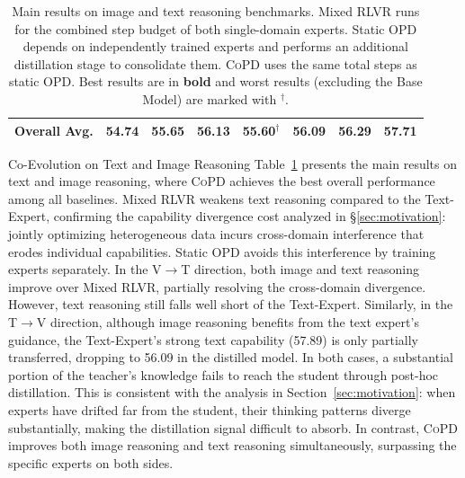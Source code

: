 \documentclass{llmxive}
\providecommand{\method}{\textsc{CoPD}\xspace}
\begin{document}
\begin{table}[t]
\begin{tabular}{l ccc c cc c}
\midrule
\rowcolor{blue!5} \textbf{Overall Avg.} & 54.74  & 55.65  & 56.13  & 55.60$^\dagger$  & 56.09  & 56.29  & \textbf{57.71} \\
\bottomrule
\end{tabular}
\caption{Main results on image and text reasoning benchmarks. Mixed RLVR runs for the combined step budget of both single-domain experts. Static OPD depends on independently trained experts and performs an additional distillation stage to consolidate them. \method uses the same total steps as static OPD. Best results are in \textbf{bold} and worst results (excluding the Base Model) are marked with $^\dagger$.}
\label{tab:two_branch_results}
\end{table}
{Co-Evolution on Text and Image Reasoning}
Table~\ref{tab:two_branch_results} presents the main results on text and image reasoning, where \method achieves the best overall performance among all baselines. Mixed RLVR weakens text reasoning compared to the Text-Expert, confirming the capability divergence cost analyzed in \S\ref{sec:motivation}: jointly optimizing heterogeneous data incurs cross-domain interference that erodes individual capabilities. Static OPD avoids this interference by training experts separately. In the V$\to$T direction, both image and text reasoning improve over Mixed RLVR, partially resolving the cross-domain divergence. However, text reasoning still falls well short of the Text-Expert. Similarly, in the T$\to$V direction, although image reasoning benefits from the text expert's guidance, the Text-Expert's strong text capability (57.89) is only partially transferred, dropping to 56.09 in the distilled model. In both cases, a substantial portion of the teacher's knowledge fails to reach the student through post-hoc distillation. This is consistent with the analysis in Section~\ref{sec:motivation}: when experts have drifted far from the student, their thinking patterns diverge substantially, making the distillation signal difficult to absorb. In contrast, \method improves both image reasoning and text reasoning simultaneously, surpassing the specific experts on both sides. 
\end{document}
